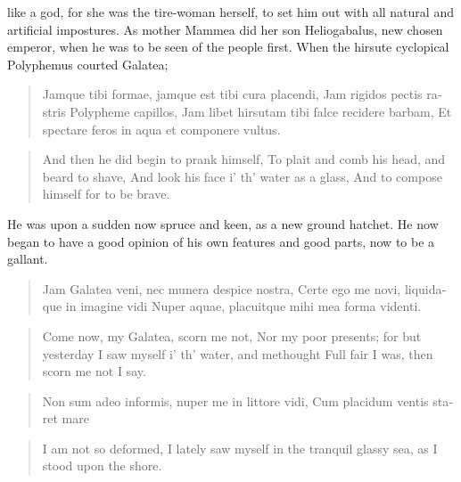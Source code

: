 like a god, for she was the tire-woman herself, to set him out with all
natural and artificial impostures. As mother Mammea did her son
Heliogabalus, new chosen emperor, when he was to be seen of the people
first. When the hirsute cyclopical Polyphemus courted Galatea;

\begin{latin}
\begin{verse}
Jamque tibi formae, jamque est tibi cura placendi,
Jam rigidos pectis rastris Polypheme capillos,
Jam libet hirsutam tibi falce recidere barbam,
Et spectare feros in aqua et componere vultus.
\end{verse}
\end{latin}
\translationrule%
\begin{verse}%
And then he did begin to prank himself,
To plait and comb his head, and beard to shave,
And look his face i' th' water as a glass,
And to compose himself for to be brave.
\end{verse}%

He was upon a sudden now spruce and keen, as a new ground hatchet. He
now began to have a good opinion of his own features and good parts,
now to be a gallant.

\begin{latin}
\begin{verse}
Jam Galatea veni, nec munera despice nostra,
Certe ego me novi, liquidaque in imagine vidi
Nuper aquae, placuitque mihi mea forma videnti.
\end{verse}
\end{latin}
\translationrule%
\begin{verse}%
Come now, my Galatea, scorn me not,
Nor my poor presents; for but yesterday
I saw myself i' th' water, and methought
Full fair I was, then scorn me not I say.
\end{verse}%

\begin{latin}
\begin{verse}
Non sum adeo informis, nuper me in littore vidi,
Cum placidum ventis staret mare
\end{verse}
\end{latin}
\translationrule%
\begin{verse}%
I am not so deformed,
I lately saw myself in the tranquil glassy sea,
as I stood upon the shore.
\end{verse}%

